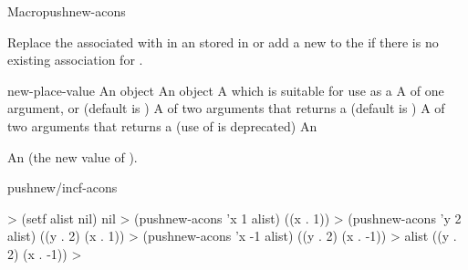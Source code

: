 \documentclass[10pt,twoside,english,pdftex]{article}
\begin{document}
\begin{functiondoc}{Macro}{pushnew-acons}{ 
    }
%
%
%
%
  
\fnsyntax

\fnpurpose Replace the  associated with  in an
 stored in  or add a new
  to the
   if there is no existing association for .

\fnpackage {}

\fnmodule {}

\fnargs
\begin{args}{new-place-value}
\arg[item] An object
\arg[value] An object
\arg[place] A  which is suitable for use as a
\arg[key] A  of one argument, or \nil{} (default is \nil)
\arg[test] A  of two arguments that returns a
 (default is ) 
 A  of two arguments that returns a
 (use of  is deprecated)
 An 
\end{args}

\fnreturns An  (the new value of
). 

\begin{alsos}{pushnew/incf-acons}
\end{alsos}

\fnexamples
%
\W\supp
\begin{example}
  > (setf alist nil)
  nil
  > (pushnew-acons 'x 1 alist)
  ((x . 1))
  > (pushnew-acons 'y 2 alist)
  ((y . 2) (x . 1))\goodpagebreak
  > (pushnew-acons 'x -1 alist)
  ((y . 2) (x . -1))
  > alist
  ((y . 2) (x . -1))
  >
\end{example}

\end{functiondoc}

\end{document}
